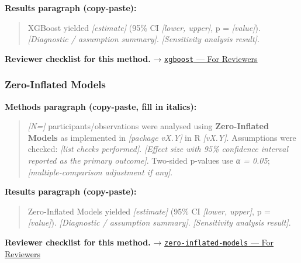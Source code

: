 \documentclass[
]{article}
\begin{document}
\textbf{Results paragraph (copy-paste):}

\begin{quote}
XGBoost yielded \emph{{[}estimate{]}} (95\% CI \emph{{[}lower,
upper{]}}, p = \emph{{[}value{]}}). \emph{{[}Diagnostic / assumption
summary{]}}. \emph{{[}Sensitivity analysis result{]}}.
\end{quote}

\textbf{Reviewer checklist for this method.} →
\href{../chapters/13-ml/xgboost.Rmd\#for-reviewers}{\texttt{xgboost} ---
For Reviewers}

\subsubsection{Zero-Inflated Models}\label{zero-inflated-models}

\textbf{Methods paragraph (copy-paste, fill in italics):}

\begin{quote}
\emph{{[}N={]}} participants/observations were analysed using
\textbf{Zero-Inflated Models} as implemented in \emph{{[}package
vX.Y{]}} in R \emph{{[}vX.Y{]}}. Assumptions were checked: \emph{{[}list
checks performed{]}}. \emph{{[}Effect size with 95\% confidence interval
reported as the primary outcome{]}}. Two-sided p-values use \emph{α =
0.05}; \emph{{[}multiple-comparison adjustment if any{]}}.
\end{quote}

\textbf{Results paragraph (copy-paste):}

\begin{quote}
Zero-Inflated Models yielded \emph{{[}estimate{]}} (95\% CI
\emph{{[}lower, upper{]}}, p = \emph{{[}value{]}}). \emph{{[}Diagnostic
/ assumption summary{]}}. \emph{{[}Sensitivity analysis result{]}}.
\end{quote}

\textbf{Reviewer checklist for this method.} →
\href{../chapters/07-regression/zero-inflated-models.Rmd\#for-reviewers}{\texttt{zero-inflated-models}
--- For Reviewers}
\end{document}
